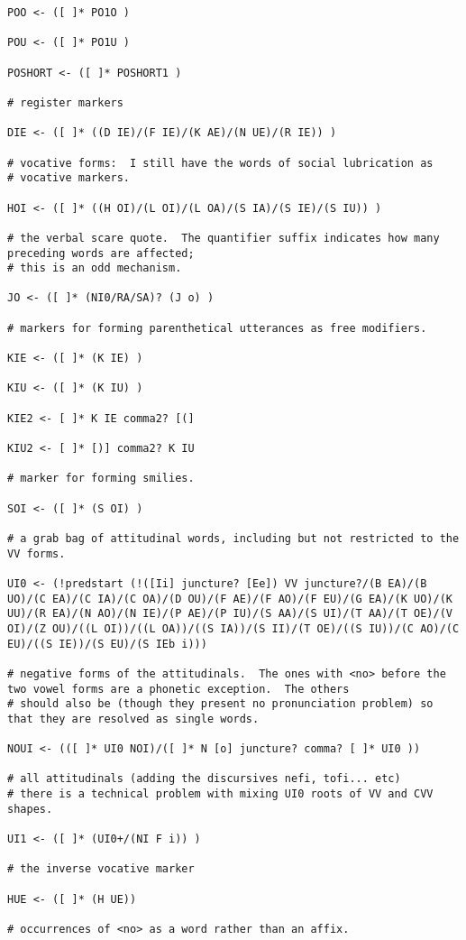\documentclass[12pt]{book}
\begin{document}
{\begin{verbatim}
POO <- ([ ]* PO1O )

POU <- ([ ]* PO1U )

POSHORT <- ([ ]* POSHORT1 )

# register markers 

DIE <- ([ ]* ((D IE)/(F IE)/(K AE)/(N UE)/(R IE)) )

# vocative forms:  I still have the words of social lubrication as 
# vocative markers.

HOI <- ([ ]* ((H OI)/(L OI)/(L OA)/(S IA)/(S IE)/(S IU)) )

# the verbal scare quote.  The quantifier suffix indicates how many preceding words are affected;
# this is an odd mechanism.

JO <- ([ ]* (NI0/RA/SA)? (J o) )

# markers for forming parenthetical utterances as free modifiers.

KIE <- ([ ]* (K IE) )

KIU <- ([ ]* (K IU) )

KIE2 <- [ ]* K IE comma2? [(]

KIU2 <- [ ]* [)] comma2? K IU

# marker for forming smilies.

SOI <- ([ ]* (S OI) )

# a grab bag of attitudinal words, including but not restricted to the VV forms.

UI0 <- (!predstart (!([Ii] juncture? [Ee]) VV juncture?/(B EA)/(B UO)/(C EA)/(C IA)/(C OA)/(D OU)/(F AE)/(F AO)/(F EU)/(G EA)/(K UO)/(K UU)/(R EA)/(N AO)/(N IE)/(P AE)/(P IU)/(S AA)/(S UI)/(T AA)/(T OE)/(V OI)/(Z OU)/((L OI))/((L OA))/((S IA))/(S II)/(T OE)/((S IU))/(C AO)/(C EU)/((S IE))/(S EU)/(S IEb i)))

# negative forms of the attitudinals.  The ones with <no> before the two vowel forms are a phonetic exception.  The others
# should also be (though they present no pronunciation problem) so that they are resolved as single words.

NOUI <- (([ ]* UI0 NOI)/([ ]* N [o] juncture? comma? [ ]* UI0 ))

# all attitudinals (adding the discursives nefi, tofi... etc)
# there is a technical problem with mixing UI0 roots of VV and CVV shapes.

UI1 <- ([ ]* (UI0+/(NI F i)) )

# the inverse vocative marker

HUE <- ([ ]* (H UE))

# occurrences of <no> as a word rather than an affix.


\end{verbatim}}
\end{document}
